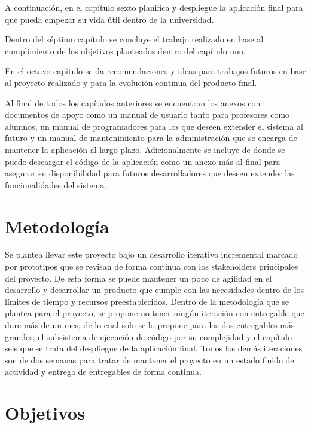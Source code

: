 A continuación, en el capítulo sexto planifica y despliegue la aplicación final para que pueda empezar su vida útil dentro de la universidad.

Dentro del séptimo capítulo se concluye el trabajo realizado en base al cumplimiento de los objetivos planteados dentro del capítulo uno.

En el octavo capítulo se da recomendaciones y ideas para trabajos futuros en base al proyecto realizado y para la evolución continua del producto final.

Al final de todos los capítulos anteriores se encuentran los anexos con documentos de apoyo como un manual de usuario tanto para profesores como alumnos, un manual de programadores para los que deseen extender el sistema al futuro y un manual de mantenimiento para la administración que se encarga de mantener la aplicación al largo plazo. Adicionalmente se incluye de donde se puede descargar el código de la aplicación como un anexo más al final para asegurar su disponibilidad para futuros desarrolladores que deseen extender las funcionalidades del sistema.

\section{Metodología}

Se plantea llevar este proyecto bajo un desarrollo iterativo incremental marcado por prototipos que se revisan de forma continua con los stakeholders principales del proyecto. De esta forma se puede mantener un poco de agilidad en el desarrollo y desarrollar un producto que cumple con las necesidades dentro de los límites de tiempo y recursos preestablecidos. Dentro de la metodología que se plantea para el proyecto, se propone no tener ningún iteración con entregable que dure más de un mes, de lo cual solo se lo propone para los dos entregables más grandes; el subsistema de ejecución de código por su complejidad y el capítulo seis que se trata del despliegue de la aplicación final. Todos los demás iteraciones son de dos semanas para tratar de mantener el proyecto en un estado fluido de actividad y entrega de entregables de forma continua.

\section{Objetivos}


